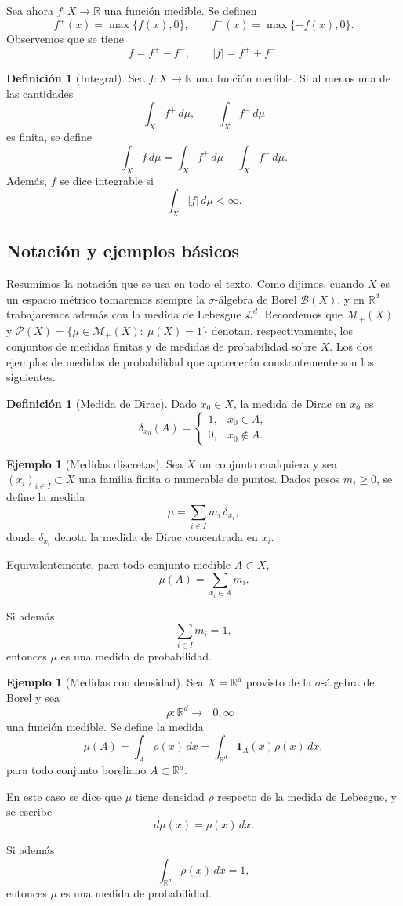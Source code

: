 \documentclass[12pt, a4paper]{amsbook}
\newcommand{\R}{{\mathbb R}}
\theoremstyle{remark}
\theoremstyle{definition}
\newtheorem{defi}[teo]{Definición}
\newtheorem{ejem}[teo]{Ejemplo}
\numberwithin{section}{chapter}
\numberwithin{subsection}{section}
\numberwithin{equation}{section}
\numberwithin{figure}{chapter}
\begin{document}
Sea ahora $f\colon X\to\R$ una función medible. Se definen
\[
f^+(x)=\max\{f(x),0\},
\qquad
f^-(x)=\max\{-f(x),0\}.
\]
Observemos que se tiene
\[
f=f^+-f^-,
\qquad
|f|=f^++f^-.
\]

\begin{defi}[Integral]
Sea \(f\colon X\to\mathbb R\) una función medible. Si al menos una de las cantidades
\[
\int_X f^+\,d\mu,
\qquad
\int_X f^-\,d\mu
\]
es finita, se define
\[
\int_X f\,d\mu
=
\int_X f^+\,d\mu
-
\int_X f^-\,d\mu.
\]
Además, \(f\) se dice integrable si
\[
\int_X |f|\,d\mu<\infty.
\]
\end{defi}


\subsection*{Notación y ejemplos básicos}\label{sec.medidas.prob}
Resumimos la notación que se usa en todo el texto. Como dijimos, cuando $X$
es un espacio métrico tomaremos siempre la $\sigma$-álgebra de Borel
$\mathcal B(X)$, y en $\mathbb R^d$ trabajaremos además con la medida de
Lebesgue $\mathcal L^d$. Recordemos que $\mathcal M_+(X)$ y
$\mathcal P(X)=\{\mu\in\mathcal M_+(X):\ \mu(X)=1\}$ denotan,
respectivamente, los conjuntos de medidas finitas y de medidas de
probabilidad sobre $X$. Los dos ejemplos de medidas de
probabilidad que aparecerán constantemente son los siguientes.

\begin{defi}[Medida de Dirac]
Dado \(x_0\in X\), la medida de Dirac en \(x_0\) es
\[
\delta_{x_0}(A)
=
\begin{cases}
1,&x_0\in A,\\
0,&x_0\notin A.
\end{cases}
\]
\end{defi}

\begin{ejem}[Medidas discretas]
Sea \(X\) un conjunto cualquiera y sea \((x_i)_{i\in I}\subset X\) una familia finita o numerable de puntos. Dados pesos \(m_i\ge0\), se define la medida
\[
\mu=\sum_{i\in I}m_i\,\delta_{x_i},
\]
donde \(\delta_{x_i}\) denota la medida de Dirac concentrada en \(x_i\).

Equivalentemente, para todo conjunto medible \(A\subset X\),
\[
\mu(A)
=
\sum_{x_i\in A}m_i.
\]

Si además
\[
\sum_{i\in I}m_i=1,
\]
entonces \(\mu\) es una medida de probabilidad.
\end{ejem}

\begin{ejem}[Medidas con densidad]
Sea \(X=\mathbb R^d\) provisto de la \(\sigma\)-álgebra de Borel y sea
\[
\rho\colon\mathbb R^d\to[0,\infty]
\]
una función medible. Se define la medida
\[
\mu(A)
=
\int_A \rho(x)\,dx
=
\int_{\mathbb R^d}\mathbf 1_A(x)\rho(x)\,dx,
\]
para todo conjunto boreliano \(A\subset\mathbb R^d\).

En este caso se dice que \(\mu\) tiene densidad \(\rho\) respecto de la medida de Lebesgue, y se escribe
\[
d\mu(x)=\rho(x)\,dx.
\]

Si además
\[
\int_{\mathbb R^d}\rho(x)\,dx=1,
\]
entonces \(\mu\) es una medida de probabilidad.
\end{ejem}
\end{document}
